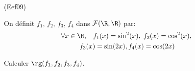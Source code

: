 \begin{tiny}(Eef09)\end{tiny} On définit $f_1$, $f_2$, $f_3$, $f_4$ dans $\mathcal{F}(\R,\R)$ par:
\begin{multline*}
 \forall x \in \R,\hspace{0.3cm} f_1(x)=\sin^2(x),\; f_2(x) = \cos^2(x),\;\\ f_3(x) = \sin(2x),
   f_4(x) = \cos(2x)
\end{multline*}

Calculer $\rg(f_1,f_2,f_3,f_4)$.
